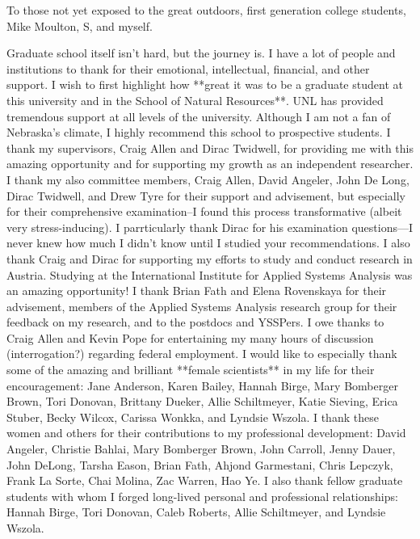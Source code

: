 \documentclass[print]{nuthesis}
\begin{document}
 \begin{dedication}
To those not yet exposed to the great outdoors, first generation college students, Mike Moulton, S, and myself.
 \end{dedication}
 \begin{acknowledgments}
Graduate school itself isn't hard, but the journey is. I have a lot of people and institutions to thank for their emotional, intellectual, financial, and other support. I wish to first highlight how **great it was to be a graduate student at this university and in the School of Natural Resources**. UNL has provided tremendous support at all levels of the university. Although I am not a fan of Nebraska's climate, I highly recommend this school to prospective students. 
I thank my supervisors, Craig Allen and Dirac Twidwell, for providing me with this amazing opportunity and for supporting my growth as an independent researcher. I thank my also committee members, Craig Allen, David Angeler, John De Long, Dirac Twidwell, and Drew Tyre for their support and advisement, but especially for their comprehensive examination--I found this process transformative (albeit very stress-inducing). I  parrticularly thank Dirac for his examination questions---I never knew how much I didn't know until I studied your recommendations. I also thank Craig and Dirac for supporting my efforts to study and conduct research in Austria. 
Studying at the International Institute for Applied Systems Analysis was an amazing opportunity! I thank Brian Fath and Elena Rovenskaya for their advisement, members of the Applied Systems Analysis research group for their feedback on my research, and to the postdocs and YSSPers. I owe thanks to Craig Allen and Kevin Pope for entertaining my many hours of discussion (interrogation?) regarding federal employment. 
I would like to especially thank some of the amazing and brilliant **female scientists** in my life for their encouragement: Jane Anderson, Karen Bailey, Hannah Birge, Mary Bomberger Brown, Tori Donovan, Brittany Dueker, Allie Schiltmeyer, Katie Sieving, Erica Stuber,  Becky Wilcox, Carissa Wonkka, and Lyndsie Wszola. I thank these women and others for their contributions to my professional development: David Angeler, Christie Bahlai, Mary Bomberger Brown, John Carroll, Jenny Dauer, John DeLong, Tarsha Eason, Brian Fath, Ahjond Garmestani, Chris Lepczyk, Frank La Sorte, Chai Molina, Zac Warren, Hao Ye. I also thank fellow graduate students with whom I forged long-lived personal and professional relationships: Hannah Birge, Tori Donovan, Caleb Roberts, Allie Schiltmeyer, and Lyndsie Wszola. 

\end{acknowledgments}
\end{document}
